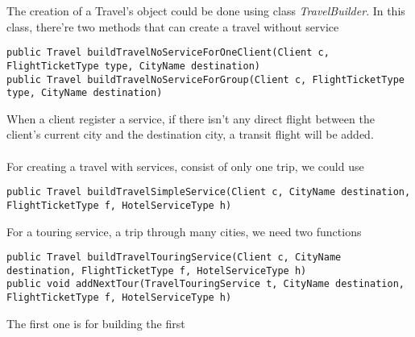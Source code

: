 The creation of a Travel's object could be done using class \textit{TravelBuilder}. In this class, there're two methods that can create a travel without service

\begin{lstlisting}
public Travel buildTravelNoServiceForOneClient(Client c, FlightTicketType type, CityName destination)
public Travel buildTravelNoServiceForGroup(Client c, FlightTicketType type, CityName destination)
\end{lstlisting}

When a client register a service, if there isn't any direct flight between the client's current city and the destination city, a transit flight will be added.  

\paragraph{}
For creating a travel with services, consist of only one trip, we could use

\begin{lstlisting}
public Travel buildTravelSimpleService(Client c, CityName destination, FlightTicketType f, HotelServiceType h)
\end{lstlisting}

For a touring service, a trip through many cities, we need two functions

\begin{lstlisting}
public Travel buildTravelTouringService(Client c, CityName destination, FlightTicketType f, HotelServiceType h)
public void addNextTour(TravelTouringService t, CityName destination, FlightTicketType f, HotelServiceType h)
\end{lstlisting}

The first one is for building the first 





